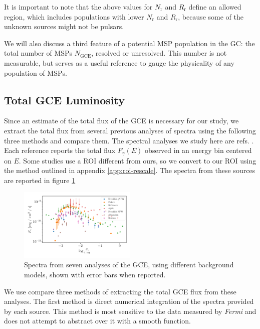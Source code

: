 \documentclass[a4paper,11pt]{article}
\newcommand{\comment}[1]{\emph{\color{red}{#1}}}
\begin{document}
It is important to note that the above values for $N_\text{r}$ and $R_\text{r}$ define an allowed region, which includes populations with lower $N_\text{r}$ and $R_\text{r}$, because some of the unknown sources might not be pulsars.



We will also discuss a third feature of a potential MSP population in the GC: the total number of MSPs $N_\text{GCE}$, resolved or unresolved. This number is not measurable, but serves as a useful reference to gauge the physicality of any population of MSPs. \comment{Mention that it's expected to be around 40,000.}


\subsection{Total GCE Luminosity}
\label{sec:total-lum}
Since an estimate of the total flux of the GCE is necessary for our study, we extract the total flux from several previous analyses of spectra using the following three methods and compare them. The spectral analyses we study here are refs. \cite{Zhong:2019ycb, Calore:2014xka, DiMauro:2021raz, Abazajian:2014fta, Gordon, Ajello:2015kwa}. Each reference reports the total flux $F_\gamma(E)$ observed in an energy bin centered on $E$. Some studies use a ROI different from ours, so we convert to our ROI using the method outlined in appendix \ref{app:roi-rescale}. The spectra from these sources are reported in figure \ref{fig:all-spectra}
\begin{figure}
    \centering
    \includegraphics[width=0.5\textwidth]{figs/all-spectra.pdf}
    \caption{Spectra from seven analyses of the GCE, using different background models, shown with error bars when reported.}
    \label{fig:all-spectra}
\end{figure}

\comment{Describe the sources: what's similar between them, what's different.}

We use compare three methods of extracting the total GCE flux from these analyses.
The first method is direct numerical integration of the spectra provided by each source. This method is most sensitive to the data measured by \textit{Fermi} and does not attempt to abstract over it with a smooth function.
\end{document}
